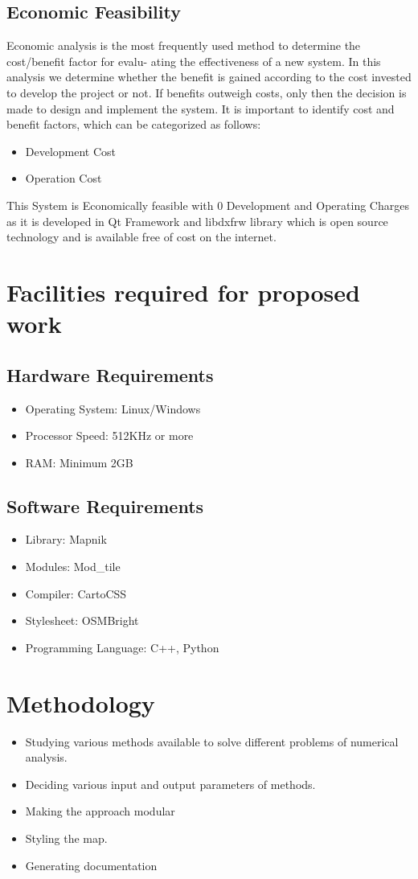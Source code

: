 \subsection{Economic Feasibility}
\noindent Economic analysis is the most frequently used method to determine the cost/benefit factor for evalu-
ating the effectiveness of a new system. In this analysis we determine whether the benefit is gained
according to the cost invested to develop the project or not. If benefits outweigh costs, only then
the decision is made to design and implement the system. It is important to identify cost and benefit
factors, which can be categorized as follows:
\begin{itemize}
\item Development Cost
\item Operation Cost
\end{itemize}
This System is Economically feasible with 0 Development and Operating Charges
as it is developed in Qt Framework and libdxfrw library which is open source technology and is available free of cost on the internet.

\section{Facilities required for proposed work}
\subsection{Hardware Requirements}
\begin{itemize}
\item Operating System: Linux/Windows
\item Processor Speed: 512KHz or more
\item RAM: Minimum 2GB
\end{itemize}
\subsection{Software Requirements}
\begin{itemize}
\item Library: Mapnik
\item Modules: Mod\_tile
\item Compiler: CartoCSS
\item Stylesheet: OSMBright 
\item Programming Language: C++, Python 
\end{itemize}

\section{Methodology}
\begin{itemize}
\item Studying various methods available to solve different problems of numerical analysis.
\item Deciding various input and output parameters of methods.
\item Making the approach modular 
\item Styling the map.
\item Generating documentation
\end{itemize}

